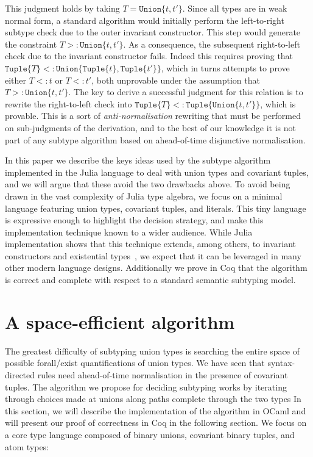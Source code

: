 \documentclass[a4paper,english]{lipics-v2019}
\newcommand{\xt}[1]{\texttt{#1}}
\newcommand{\union}[2]{\xt{Union\{}#1,#2\xt{\}}}
\newcommand{\tuple}[1]{\xt{Tuple\{}#1\xt{\}}}
\begin{document}
\noindent\!\!\!\!  This judgment holds by taking {\small$T=\union{t}{t'}$}.
Since all types are in weak normal form, a standard algorithm would
initially perform the left-to-right subtype check due to the outer invariant
constructor.  This step would generate the constraint
{\small$T>:\union{t}{t'}$}.  As a consequence, the subsequent right-to-left
check due to the invariant constructor fails.  Indeed this requires proving
that {\small$\tuple{T}<:\union{\tuple{t}}{\tuple{t'}}$}, which in turns
attempts to prove either {\small$T<:t$} or {\small$T<:t'$}, both unprovable
under the assumption that {\small$T>:\union{t}{t'}$}. The key to derive a
successful judgment for this relation is to rewrite the right-to-left check
into {\small$\tuple{T}<:\tuple{\union{t}{t'}}$}, which is provable. This is
a sort of \emph{anti-normalisation} rewriting that must be performed on
sub-judgments of the derivation, and to the best of our knowledge it is not
part of any subtype algorithm based on ahead-of-time disjunctive
normalisation.

In this paper we describe the keys ideas used by the subtype algorithm
implemented in the Julia language to deal with union types and covariant
tuples, and we will argue that these avoid the two drawbacks above.  To
avoid being drawn in the vast complexity of Julia type algebra, we focus on
a minimal language featuring union types, covariant tuples, and literals.
This tiny language is expressive enough to highlight the decision strategy,
and make this implementation technique known to a wider audience.  While
Julia implementation shows that this technique extends, among others, to
invariant constructors and existential types~\cite{DBLP:NardelliBPCBV18}, we
expect that it can be leveraged in many other modern language designs.
Additionally we prove in Coq that the algorithm is correct and complete with
respect to a standard semantic subtyping model.


\section{A space-efficient algorithm}

The greatest difficulty of subtyping union types is searching the entire space
of possible forall/exist quantifications of union types. We have seen that
syntax-directed rules need ahead-of-time normalisation in the presence of
covariant tuples.
The algorithm we propose for deciding subtyping works by iterating through
choices made at unions along paths complete through the two types In this
section, we will describe the implementation of the algorithm in OCaml and
will present our proof of correctness in Coq in the following section.
We focus on a core type language composed of binary unions, covariant binary
tuples, and atom types:
\end{document}
